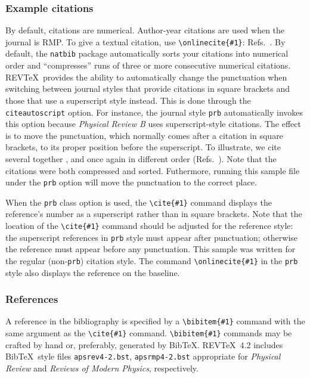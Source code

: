 \documentclass[%
 reprint,
 amsmath,amssymb,
 aps,
]{revtex4-2}
\begin{document}
  \subsubsection{Example citations}
  By default, citations are numerical\cite{Beutler1994}.
  Author-year citations are used when the journal is RMP. 
  To give a textual citation, use \verb+\onlinecite{#1}+: 
  Refs.~. 
  By default, the \texttt{natbib} package automatically sorts your citations into numerical order and ``compresses'' runs of three or more consecutive numerical citations.
  REV\TeX\ provides the ability to automatically change the punctuation when switching between journal styles that provide citations in square brackets and those that use a superscript style instead. This is done through the \texttt{citeautoscript} option. For instance, the journal style \texttt{prb} automatically invokes this option because \textit{Physical 
  Review B} uses superscript-style citations. The effect is to move the punctuation, which normally comes after a citation in square brackets, to its proper position before the superscript. 
  To illustrate, we cite several together 
  \cite{[See the explanation of time travel in ]feyn54,*[The classical relativistic treatment of ][ is a relative classic]epr,witten2001,Berman1983,Davies1998,Bire82}, 
  and once again in different order (Refs.~\cite{epr,feyn54,Bire82,Berman1983,witten2001,Davies1998}). 
  Note that the citations were both compressed and sorted. Futhermore, running this sample file under the \texttt{prb} option will move the punctuation to the correct place.

  When the \verb+prb+ class option is used, the \verb+\cite{#1}+ command
  displays the reference's number as a superscript rather than in
  square brackets. Note that the location of the \verb+\cite{#1}+
  command should be adjusted for the reference style: the superscript
  references in \verb+prb+ style must appear after punctuation;
  otherwise the reference must appear before any punctuation. This
  sample was written for the regular (non-\texttt{prb}) citation style.
  The command \verb+\onlinecite{#1}+ in the \texttt{prb} style also
  displays the reference on the baseline.

  \subsubsection{References}
  A reference in the bibliography is specified by a \verb+\bibitem{#1}+ command
  with the same argument as the \verb+\cite{#1}+ command.
  \verb+\bibitem{#1}+ commands may be crafted by hand or, preferably,
  generated by Bib\TeX. 
  REV\TeX~4.2 includes Bib\TeX\ style files
  \verb+apsrev4-2.bst+, \verb+apsrmp4-2.bst+ appropriate for
  \textit{Physical Review} and \textit{Reviews of Modern Physics},
  respectively.
\end{document}
